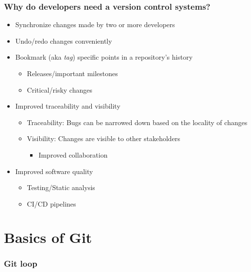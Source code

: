 \documentclass{beamer}
\begin{document}
\begin{frame}
  \frametitle{Why do developers need a version control systems?}
  \begin{itemize}
  \item<1-> Synchronize changes made by two or more developers
  \item<2-> Undo/redo changes conveniently
  \item<3-> Bookmark (aka \textit{tag}) specific points in a repository's history
    \begin{itemize}
    \item<4-> Releases/important milestones
    \item<5-> Critical/risky changes
    \end{itemize}
  \item<6-> Improved traceability and visibility
    \begin{itemize}
    \item<7-> Traceability: Bugs can be narrowed down based on the locality of changes
    \item<8-> Visibility: Changes are visible to other stakeholders
      \begin{itemize}
      \item<8-> Improved collaboration
      \end{itemize}
    \end{itemize}
  \item<9-> Improved software quality
    \begin{itemize}
    \item<10-> Testing/Static analysis
    \item<11-> CI/CD pipelines
    \end{itemize}
  \end{itemize}
\end{frame}

\section{Basics of Git}
\begin{frame}
  \frametitle{Git loop}
  {\centering
    }
\end{frame}
\end{document}
